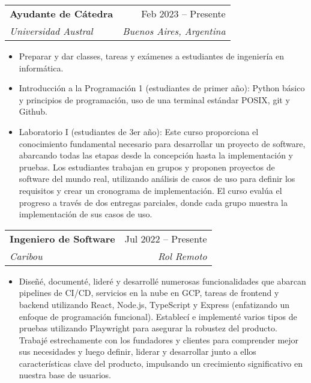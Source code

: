 \documentclass[letterpaper,11pt]{article}
\makeatletter
\newcommand{\resumeItem}[1]{
  \item\small{
    {#1 \vspace{-2pt}}
  }
}
\newcommand{\resumeSubheading}[4]{
  \vspace{-2pt}\item
    \begin{tabular*}{0.97\textwidth}[t]{l@{\extracolsep{\fill}}r}
      \textbf{#1} & #2 \\
      \textit{\small#3} & \textit{\small #4} \\
    \end{tabular*}\vspace{-7pt}
}
\newcommand{\resumeSubSubheading}[2]{
    \item
    \begin{tabular*}{0.97\textwidth}{l@{\extracolsep{\fill}}r}
      \textit{\small#1} & \textit{\small #2} \\
    \end{tabular*}\vspace{-7pt}
}
\newcommand{\resumeSubHeadingListEnd}{\end{itemize}}
\newcommand{\resumeItemListStart}{\begin{itemize}}
\newcommand{\resumeItemListEnd}{\end{itemize}\vspace{-5pt}}
\makeatother
\begin{document}
    \resumeSubheading
      {Ayudante de Cátedra}{Feb 2023 -- Presente}
      {Universidad Austral}{Buenos Aires, Argentina}
      \resumeItemListStart
        \resumeItem{Preparar y dar classes, tareas y exámenes a estudiantes de ingeniería en informática.}
        \resumeItem{Introducción a la Programación 1 (estudiantes de primer año): Python básico y principios de programación, uso de una terminal estándar POSIX, git y Github.}
        \resumeItem{Laboratorio I (estudiantes de 3er año):
        Este curso proporciona el conocimiento fundamental necesario para desarrollar un proyecto de software, abarcando todas las etapas desde la concepción hasta la implementación y pruebas. Los estudiantes trabajan en grupos y proponen proyectos de software del mundo real, utilizando análisis de casos de uso para definir los requisitos y crear un cronograma de implementación. El curso evalúa el progreso a través de dos entregas parciales, donde cada grupo muestra la implementación de sus casos de uso.}
        \resumeItemListEnd
    \resumeSubheading
      {Ingeniero de Software}{Jul 2022 -- Presente}
      {Caribou}{Rol Remoto}
      \resumeItemListStart
        \resumeItem{Diseñé, documenté, lideré y desarrollé numerosas funcionalidades que abarcan pipelines de CI/CD, servicios en la nube en GCP, tareas de frontend y backend utilizando React, Node.js, TypeScript y Express (enfatizando un enfoque de programación funcional). Establecí e implementé varios tipos de pruebas utilizando Playwright para asegurar la robustez del producto. Trabajé estrechamente con los fundadores y clientes para comprender mejor sus necesidades y luego definir, liderar y desarrollar junto a ellos características clave del producto, impulsando un crecimiento significativo en nuestra base de usuarios.}
      \resumeItemListEnd
      
\end{document}
